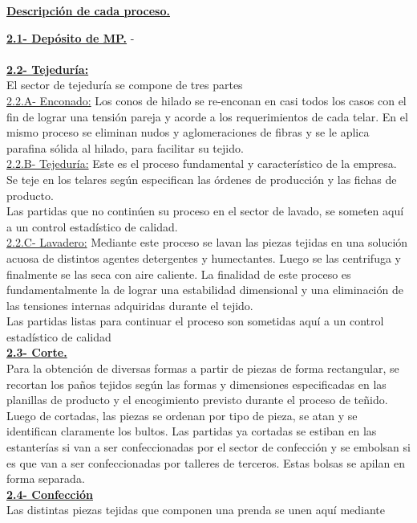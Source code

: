 \documentclass[a4paper,10pt,titlepage]{article}
\begin{document}
\begin{center}\textbf{\underline{Descripci\'on de cada proceso.}}\end{center}
\textbf{\underline{2.1- Dep\'osito de MP.}} 
 -\\ \\
\textbf{\underline{2.2- Tejedur\'ia:}}\\
El sector de tejedur\'ia se compone de tres partes\\
\underline{2.2.A- Enconado:} Los conos de hilado se re-enconan en casi todos los casos con
el fin de lograr una tensi\'on pareja y acorde a los requerimientos de cada telar. En
el mismo proceso se eliminan nudos y aglomeraciones de fibras y se le aplica
parafina s\'olida al hilado, para facilitar su tejido.\\
\underline{2.2.B- Tejedur\'ia:} Este es el proceso fundamental y caracter\'istico de la empresa.
Se teje en los telares seg\'un especifican las \'ordenes de producci\'on y las fichas de
producto.\\
Las partidas que no contin\'uen su proceso en el sector de lavado, se someten aqu\'i
a un control estad\'istico de calidad.\\
\underline{2.2.C- Lavadero:} Mediante este proceso se lavan las piezas tejidas en una soluci\'on
acuosa de distintos agentes detergentes y humectantes. Luego se las centrifuga y
finalmente se las seca con aire caliente. La finalidad de este proceso es
fundamentalmente la de lograr una estabilidad dimensional y una eliminaci\'on de
las tensiones internas adquiridas durante el tejido.\\
Las partidas listas para continuar el proceso son sometidas aqu\'i a un control
estad\'istico de calidad\\
\textbf{\underline{2.3- Corte.}}\\
Para la obtenci\'on de diversas formas a partir de piezas de forma rectangular, se
recortan los paños tejidos seg\'un las formas y dimensiones especificadas en las
planillas de producto y el encogimiento previsto durante el proceso de teñido.
Luego de cortadas, las piezas se ordenan por tipo de pieza, se atan y se identifican
claramente los bultos. Las partidas ya cortadas se estiban en las estanter\'ias si van
a ser confeccionadas por el sector de confecci\'on y se embolsan si es que van a ser
confeccionadas por talleres de terceros. Estas bolsas se apilan en forma separada.\\
\textbf{\underline{2.4- Confecci\'on}}\\
Las distintas piezas tejidas que componen una prenda se unen aqu\'i mediante
\end{document}
